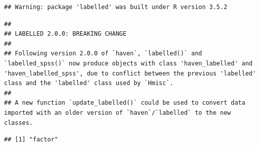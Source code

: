 \documentclass[]{book}
\newenvironment{Shaded}{\begin{snugshade}}{\end{snugshade}}
\newcommand{\KeywordTok}[1]{\textcolor[rgb]{0.13,0.29,0.53}{\textbf{#1}}}
\newcommand{\NormalTok}[1]{#1}
\newcommand{\OperatorTok}[1]{\textcolor[rgb]{0.81,0.36,0.00}{\textbf{#1}}}
\newcommand{\StringTok}[1]{\textcolor[rgb]{0.31,0.60,0.02}{#1}}
\theoremstyle{definition}
\theoremstyle{definition}
\theoremstyle{definition}
\theoremstyle{remark}
\begin{document}
\begin{verbatim}
## Warning: package 'labelled' was built under R version 3.5.2
\end{verbatim}

\begin{verbatim}
## 
## LABELLED 2.0.0: BREAKING CHANGE
## 
## Following version 2.0.0 of `haven`, `labelled()` and `labelled_spss()` now produce objects with class 'haven_labelled' and 'haven_labelled_spss', due to conflict between the previous 'labelled' class and the 'labelled' class used by `Hmisc`.
## 
## A new function `update_labelled()` could be used to convert data imported with an older version of `haven`/`labelled` to the new classes.
\end{verbatim}

\begin{Shaded}
\end{Shaded}

\begin{verbatim}
## [1] "factor"
\end{verbatim}

\begin{Shaded}
\end{Shaded}
\end{document}
